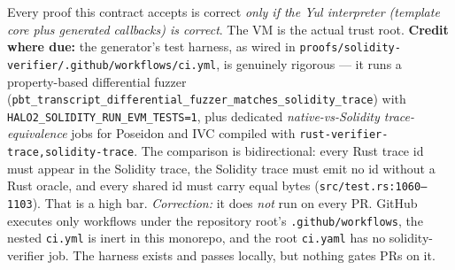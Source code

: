 Every proof this contract accepts is correct \emph{only if the
Yul interpreter (template core plus generated callbacks) is correct}. The VM is the actual
trust root. \textbf{Credit where due:} the generator's test
harness, as wired in
\texttt{proofs/\allowbreak{}solidity-verifier/\allowbreak{}.github/\allowbreak{}workflows/\allowbreak{}ci.yml}, is
genuinely rigorous --- it runs a property-based differential
fuzzer (\texttt{pbt\_\allowbreak{}transcript\_\allowbreak{}differential\_\allowbreak{}fuzzer\_\allowbreak{}matches\_\allowbreak{}solidity\_\allowbreak{}trace})
with \texttt{HALO2\_\allowbreak{}SOLIDITY\_\allowbreak{}RUN\_\allowbreak{}EVM\_\allowbreak{}TESTS=1}, plus dedicated
\emph{native-vs-Solidity trace-equivalence} jobs for Poseidon and
IVC compiled with
\texttt{rust-verifier-trace,solidity-trace}. The comparison is
bidirectional: every Rust trace id must appear in the Solidity
trace, the Solidity trace must emit no id without a Rust
oracle, and every shared id must carry equal bytes
(\texttt{src/\allowbreak{}test.rs:1060--1103}). That is a high bar.
\emph{Correction:} it does \emph{not} run on every PR. GitHub executes
only workflows under the repository root's \texttt{.github/workflows},
the nested \texttt{ci.yml} is inert in this monorepo, and the root
\texttt{ci.yaml} has no solidity-verifier job. The harness exists and
passes locally, but nothing gates PRs on it.

